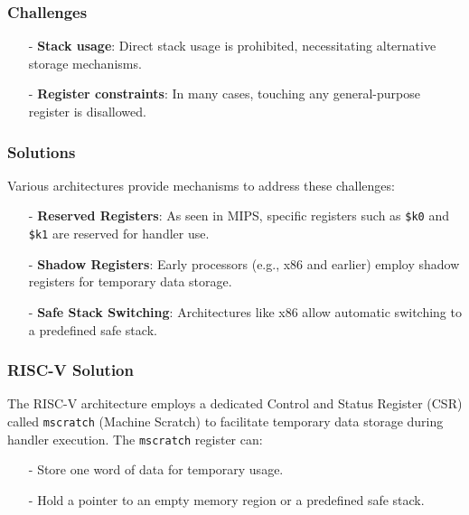 \subsubsection*{Challenges}
\begin{itemize}
    \item[-] \textbf{Stack usage}: Direct stack usage is prohibited, necessitating alternative storage mechanisms.
    \item[-] \textbf{Register constraints}: In many cases, touching any general-purpose register is disallowed.
\end{itemize}

\subsubsection*{Solutions}
Various architectures provide mechanisms to address these challenges:
\begin{itemize}
    \item[-] \textbf{Reserved Registers}: As seen in MIPS, specific registers such as \texttt{\$k0} and \texttt{\$k1} are reserved for handler use.
    \item[-] \textbf{Shadow Registers}: Early processors (e.g., x86 and earlier) employ shadow registers for temporary data storage.
    \item[-] \textbf{Safe Stack Switching}: Architectures like x86 allow automatic switching to a predefined safe stack.
\end{itemize}

\subsubsection*{RISC-V Solution}
The RISC-V architecture employs a dedicated Control and Status Register (CSR) called \texttt{mscratch} (Machine Scratch) to facilitate temporary data storage during handler execution. The \texttt{mscratch} register can:
\begin{itemize}
    \item[-] Store one word of data for temporary usage.
    \item[-] Hold a pointer to an empty memory region or a predefined safe stack.
\end{itemize}


